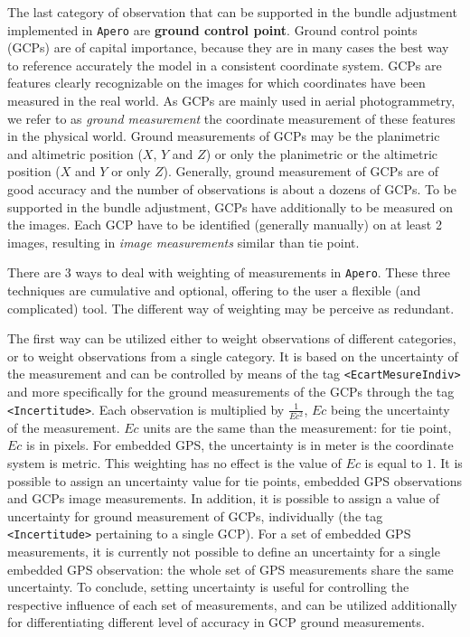 The last category of observation that can be supported in the bundle adjustment implemented in {\tt Apero} are {\bf ground control point}. 
Ground control points (GCPs) are of capital importance, because they are in many cases the best way to reference accurately the model in a consistent coordinate system. 
GCPs are features clearly recognizable on the images for which coordinates have been measured in the real world. 
As GCPs are mainly used in aerial photogrammetry, we refer to as {\it ground measurement}  the coordinate measurement of these features in the physical world. 
Ground measurements of GCPs may be the planimetric and altimetric position ($X$, $Y$ and $Z$) or only the planimetric or the altimetric position ($X$ and $Y$ or only $Z$). 
Generally, ground measurement of GCPs are of good accuracy and the number of observations is about a dozens of GCPs. 
To be supported in the bundle adjustment, GCPs have additionally to be measured on the images. 
Each GCP have to be identified (generally manually) on at least 2 images, resulting in {\it image measurements} similar than tie point. 

There are 3 ways to deal with weighting of measurements in {\tt Apero}. 
These three techniques are cumulative and optional, offering to the user a flexible (and complicated) tool. 
The different way of weighting may be perceive as redundant. 

The first way can be utilized either to weight observations of different categories, or to weight observations from a single category. 
It is based on the uncertainty of the measurement and can be controlled by means of the tag {\tt <EcartMesureIndiv>} and more specifically for the ground measurements of the GCPs through the tag {\tt <Incertitude>}. 
Each observation is multiplied by $\frac1{Ec^2}$, $Ec$ being the uncertainty of the measurement. 
$Ec$ units are the same than the measurement: for tie point, $Ec$ is in pixels. 
For embedded GPS, the uncertainty is in meter is the coordinate system is metric. 
This weighting has no effect is the value of $Ec$ is equal to $1$. 
It is possible to assign an uncertainty value for tie points, embedded GPS observations and GCPs image measurements. 
In addition, it is possible to assign a value of uncertainty for ground measurement of GCPs, individually (the tag {\tt <Incertitude>} pertaining to a single GCP). 
For a set of embedded GPS measurements, it is currently not possible to define an uncertainty for a single embedded GPS observation: the whole set of GPS measurements share the same uncertainty. 
To conclude, setting uncertainty is useful for controlling the respective influence of each set of measurements, and can be utilized additionally for differentiating different level of accuracy in GCP ground measurements. 

